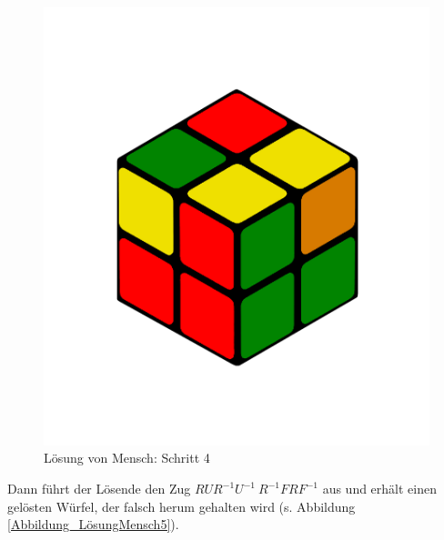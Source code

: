 \documentclass[12pt,a4paper, usenames, dvipsnames]{article}
\theoremstyle{mystyle}
\theoremstyle{definition}
\begin{document}
\begin{figure}[H]
\centering
\includegraphics[scale=0.12]{menschSchritt4.png}
\caption[Lösung von Mensch: Schritt 4]{Lösung von Mensch: Schritt 4}
\label{Abbildung_LösungMensch4}
\end{figure} 

Dann führt der Lösende den Zug $RUR^{-1}U^{-1} \ R^{-1}FRF^{-1}$ aus \cite{RF2} und erhält einen gelösten Würfel, der falsch herum gehalten wird (s. Abbildung \ref{Abbildung_LösungMensch5}). 
\end{document}
